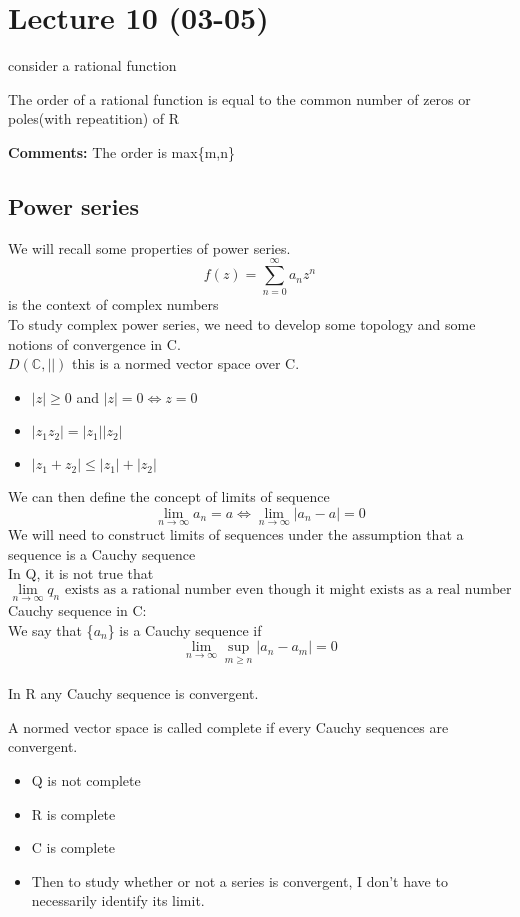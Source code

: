 \section{Lecture 10 (03-05)}
\begin{lemma}[]{}
consider a rational function
\end{lemma}
\begin{definition}{}
The order of a rational function is equal to the common number of zeros or poles(with repeatition) of R
\end{definition}
\textbf{Comments:}
The order is max\{m,n\}
\subsection{Power series}
We will recall some properties of power series.$$
    f(z)=\sum_{n=0}^{\infty}a_nz^n
$$ is the context of complex numbers
\\To study complex power series, we need to develop some topology and some notions of convergence in C.
\\$ D(\mathbb{C},||) $ this is a normed vector space over C.\begin{itemize}
\item $ |z|\geq0  $ and $ |z|=0\Leftrightarrow z=0 $
\item $ |z_1z_2|=|z_1||z_2| $
\item $ |z_1+z_2|\leq|z_1|+|z_2| $
\end{itemize} 
We can then define the concept of limits of sequence$$
    \lim_{n\rightarrow\infty}a_n=a\Leftrightarrow \lim_{n\rightarrow\infty}|a_n-a|=0
$$ 
We will need to construct limits of sequences under the assumption that a sequence is a Cauchy sequence
\\In Q, it is not true that $$
    \lim_{n\rightarrow\infty}q_n \text{ exists as a rational number even though it might exists as a real number} 
$$ 
Cauchy sequence in C:
\\We say that \{$ a_n $\} is a Cauchy sequence if $$
    \lim_{n\rightarrow\infty}\sup_{m\geq n}|a_n-a_m|=0
$$ 
\\In R any Cauchy sequence is convergent.
\begin{definition}[]{}
A normed vector space is called complete if every Cauchy sequences are convergent.
\end{definition}
\begin{itemize}
\item Q is not complete
\item R is complete
\item C is complete
\item Then to study whether or not a series is convergent, I don't have to necessarily identify its limit.
\end{itemize}
